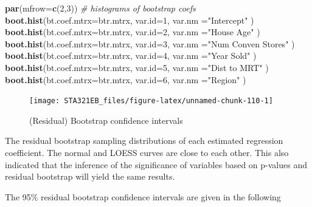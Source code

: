\documentclass[
]{book}
\newenvironment{Shaded}{\begin{snugshade}}{\end{snugshade}}
\newcommand{\AttributeTok}[1]{\textcolor[rgb]{0.13,0.29,0.53}{#1}}
\newcommand{\CommentTok}[1]{\textcolor[rgb]{0.56,0.35,0.01}{\textit{#1}}}
\newcommand{\DecValTok}[1]{\textcolor[rgb]{0.00,0.00,0.81}{#1}}
\newcommand{\FunctionTok}[1]{\textcolor[rgb]{0.13,0.29,0.53}{\textbf{#1}}}
\newcommand{\NormalTok}[1]{#1}
\newcommand{\StringTok}[1]{\textcolor[rgb]{0.31,0.60,0.02}{#1}}
\begin{document}
\begin{Shaded}
\begin{Highlighting}[]
\FunctionTok{par}\NormalTok{(}\AttributeTok{mfrow=}\FunctionTok{c}\NormalTok{(}\DecValTok{2}\NormalTok{,}\DecValTok{3}\NormalTok{))  }\CommentTok{\# histograms of bootstrap coefs}
\FunctionTok{boot.hist}\NormalTok{(}\AttributeTok{bt.coef.mtrx=}\NormalTok{btr.mtrx, }\AttributeTok{var.id=}\DecValTok{1}\NormalTok{, }\AttributeTok{var.nm =}\StringTok{"Intercept"}\NormalTok{ )}
\FunctionTok{boot.hist}\NormalTok{(}\AttributeTok{bt.coef.mtrx=}\NormalTok{btr.mtrx, }\AttributeTok{var.id=}\DecValTok{2}\NormalTok{, }\AttributeTok{var.nm =}\StringTok{"House Age"}\NormalTok{ )}
\FunctionTok{boot.hist}\NormalTok{(}\AttributeTok{bt.coef.mtrx=}\NormalTok{btr.mtrx, }\AttributeTok{var.id=}\DecValTok{3}\NormalTok{, }\AttributeTok{var.nm =}\StringTok{"Num Conven Stores"}\NormalTok{ )}
\FunctionTok{boot.hist}\NormalTok{(}\AttributeTok{bt.coef.mtrx=}\NormalTok{btr.mtrx, }\AttributeTok{var.id=}\DecValTok{4}\NormalTok{, }\AttributeTok{var.nm =}\StringTok{"Year Sold"}\NormalTok{ )}
\FunctionTok{boot.hist}\NormalTok{(}\AttributeTok{bt.coef.mtrx=}\NormalTok{btr.mtrx, }\AttributeTok{var.id=}\DecValTok{5}\NormalTok{, }\AttributeTok{var.nm =}\StringTok{"Dist to MRT"}\NormalTok{ )}
\FunctionTok{boot.hist}\NormalTok{(}\AttributeTok{bt.coef.mtrx=}\NormalTok{btr.mtrx, }\AttributeTok{var.id=}\DecValTok{6}\NormalTok{, }\AttributeTok{var.nm =}\StringTok{"Region"}\NormalTok{ )}
\end{Highlighting}
\end{Shaded}

\begin{figure}

{\centering \texttt{[image: STA321EB\_files/figure-latex/unnamed-chunk-110-1]} 

}

\caption{(Residual) Bootstrap confidence intervals}\label{fig:unnamed-chunk-110}
\end{figure}

The residual bootstrap sampling distributions of each estimated regression coefficient. The normal and LOESS curves are close to each other. This also indicated that the inference of the significance of variables based on p-values and residual bootstrap will yield the same results.

The 95\% residual bootstrap confidence intervals are given in the following
\end{document}
